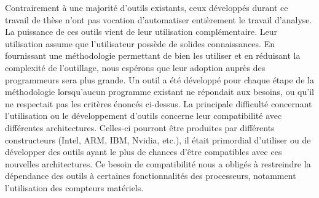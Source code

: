         Contrairement à une majorité d'outils existants, ceux développés durant ce travail de thèse n'ont pas vocation d'automatiser entièrement le travail d'analyse. La puissance de ces outils vient de leur utilisation complémentaire. Leur utilisation assume que l'utilisateur possède de solides connaissances. En fournissant une méthodologie permettant de bien les utiliser et en réduisant la complexité de l'outillage, nous espérons que leur adoption auprès des programmeurs sera plus grande. Un outil a été développé pour chaque étape de la méthodologie lorsqu'aucun programme existant ne répondait aux besoins, ou qu'il ne respectait pas les critères énoncés ci-dessus. La principale difficulté concernant l'utilisation ou le développement d'outils concerne leur compatibilité avec différentes architectures. Celles-ci pourront être produites par différents constructeurs (Intel, ARM, IBM, Nvidia, etc.), il était primordial d'utiliser ou de développer des outils ayant le plus de chances d'être compatibles avec ces nouvelles architectures. Ce besoin de compatibilité nous a obligés à restreindre la dépendance des outils à certaines fonctionnalités des processeurs, notamment l'utilisation des compteurs matériels.
        
